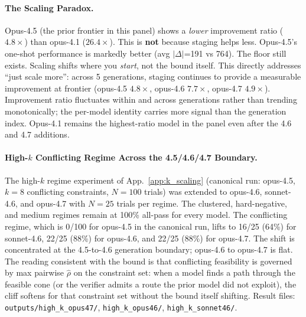 \documentclass{article}
\theoremstyle{plain}
\theoremstyle{definition}
\theoremstyle{remark}
\newcommand{\appref}[1]{App.~\ref{#1}}
\begin{document}
\paragraph{The Scaling Paradox.}
Opus-4.5 (the prior frontier in this panel) shows a \emph{lower} improvement ratio ($4.8\times$) than opus-4.1 ($26.4\times$). This is \textbf{not} because staging helps less. Opus-4.5's one-shot performance is markedly better (avg $|\Delta|$=191 vs 764). The floor still exists. Scaling shifts where you \emph{start}, not the bound itself. This directly addresses ``just scale more'': across 5 generations, staging continues to provide a measurable improvement at frontier (opus-4.5 $4.8\times$, opus-4.6 $7.7\times$, opus-4.7 $4.9\times$). Improvement ratio fluctuates within and across generations rather than trending monotonically; the per-model identity carries more signal than the generation index. Opus-4.1 remains the highest-ratio model in the panel even after the 4.6 and 4.7 additions.

\paragraph{High-$k$ Conflicting Regime Across the 4.5/4.6/4.7 Boundary.}
The high-$k$ regime experiment of \appref{app:k_scaling} (canonical run: opus-4.5, $k=8$ conflicting constraints, $N=100$ trials) was extended to opus-4.6, sonnet-4.6, and opus-4.7 with $N=25$ trials per regime. The clustered, hard-negative, and medium regimes remain at 100\% all-pass for every model. The conflicting regime, which is 0/100 for opus-4.5 in the canonical run, lifts to 16/25 (64\%) for sonnet-4.6, 22/25 (88\%) for opus-4.6, and 22/25 (88\%) for opus-4.7. The shift is concentrated at the 4.5-to-4.6 generation boundary; opus-4.6 to opus-4.7 is flat. The reading consistent with the bound is that conflicting feasibility is governed by max pairwise $\hat\rho$ on the constraint set: when a model finds a path through the feasible cone (or the verifier admits a route the prior model did not exploit), the cliff softens for that constraint set without the bound itself shifting. Result files: \texttt{outputs/high\_k\_opus47/}, \texttt{high\_k\_opus46/}, \texttt{high\_k\_sonnet46/}.
\end{document}
